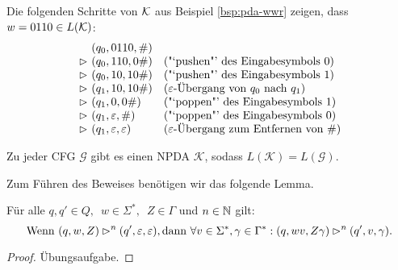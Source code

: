 \begin{Bsp*}
  Die folgenden Schritte von $\mathcal{K}$ aus Beispiel \ref{bsp:pda-wwr} zeigen, dass $w = 0110 \in L(\mathcal{K})$:
  \begin{displaymath}
  \begin{array}{r@{\ }ll}
    & (q_0, 0110, \#) \\
    \ConfRel & (q_0, 110, 0\#)  &\text{("`pushen"' des Eingabesymbols $0$)}\\
    \ConfRel & (q_0, 10, 10\#)  &\text{("`pushen"' des Eingabesymbols $1$)}\\
    \ConfRel & (q_1, 10, 10\#)  &\text{($\Eps$-Übergang von $q_0$ nach $q_1$)} \\
    \ConfRel & (q_1, 0, 0\#)  &\text{("`poppen"' des Eingabesymbols $1$)}\\
    \ConfRel & (q_1,\Eps, \#) &\text{("`poppen"' des Eingabesymbols $0$)}\\
    \ConfRel & (q_1, \Eps, \Eps) &\text{($\Eps$-Übergang zum Entfernen von $\#$)}
  \end{array}
\end{displaymath}
\end{Bsp*}

\begin{lemma}\label{lem:4.cfgToNpda}
 Zu jeder \ac{CFG} $\mathcal{G}$ gibt es einen \ac{NPDA} $\mathcal{K}$, sodass $L(\mathcal{K})=L(\mathcal{G})$.
\end{lemma}

  Zum Führen des Beweises benötigen wir das folgende Lemma.

\begin{lemma}\label{lem:4.mehrKeller}
Für alle $q,q' \in Q,\enspace w \in \Sigma^*,\enspace Z \in \Gamma$ und $n \in \mathbb{N}$ gilt:
  \begin{displaymath}
    \text{Wenn } (q,w,Z) \rhd^n (q', \varepsilon, \varepsilon), \text{dann } \forall v \in \Sigma^*, \gamma \in \Gamma^*: (q, wv, Z\gamma) \rhd^n (q', v, \gamma).
    \qedhere
  \end{displaymath}
\end{lemma}
\begin{proof}
Übungsaufgabe.
\end{proof}


